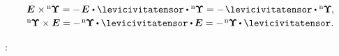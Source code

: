 \begin{otherlanguage}{russian}
\nopagebreak\vspace{-0.2em}\begin{equation*}\begin{array}{c}
\UnitDyad \hspace{.1ex} \times \hspace{-0.1ex} {^\mathrm{n}\hspace{-0.12ex}\bm{\Upsilon}}
= - \hspace{.2ex} \UnitDyad \hspace{.1ex} \dotp \levicivitatensor \dotp {^\mathrm{n}\hspace{-0.12ex}\bm{\Upsilon}}
= - \hspace{.2ex} \levicivitatensor \dotp {^\mathrm{n}\hspace{-0.12ex}\bm{\Upsilon}} \hspace{-0.15ex},
\\[.2em]
%
{^\mathrm{n}\hspace{-0.12ex}\bm{\Upsilon}} \times \UnitDyad
= - \hspace{.2ex} {^\mathrm{n}\hspace{-0.12ex}\bm{\Upsilon}} \hspace{-0.1ex} \dotp \levicivitatensor \dotp \hspace{-0.1ex} \UnitDyad
= - \hspace{.2ex} {^\mathrm{n}\hspace{-0.12ex}\bm{\Upsilon}} \hspace{-0.1ex} \dotp \levicivitatensor
\hspace{.1ex} .
\end{array}\end{equation*}

\vspace{-0.1em}
  \ru{,}  :


\end{otherlanguage}

